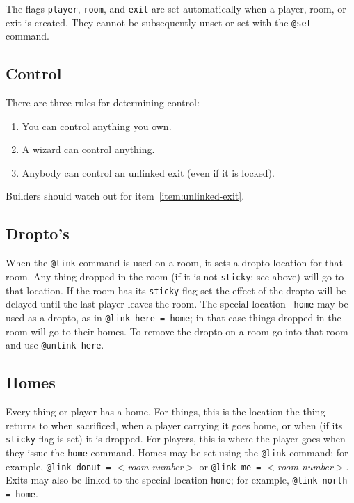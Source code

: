 The flags {\tt player\/}, {\tt room\/}, and {\tt exit} are set
automatically when a player, room, or exit is created.  They cannot be
subsequently unset or set with the \verb|@set| command.

\subsection{Control}
\label{sec:control}

There are three rules for determining control:
\begin{enumerate}
\item
You can control anything you own.
\item
A wizard can control anything.
\item\label{item:unlinked-exit}
Anybody can control an unlinked exit (even if it is locked).
\end{enumerate}
Builders should watch out for item~\ref{item:unlinked-exit}.

\subsection{Dropto's}
\label{sec:droptos}

When the {\tt @link} command is used on a room, it sets a dropto
location for that room.  Any thing dropped in the room (if it is not
{\tt sticky\/}; see above) will go to that location.  If the room has
its {\tt sticky\/} flag set the effect of the dropto will be delayed
until the last player leaves the room.  The special location {\tt
home} may be used as a dropto, as in {\tt @link here = home\/}; in
that case things dropped in the room will go to their
homes.  To remove the dropto on a room go into
that room and use {\tt @unlink here\/}.

\subsection{Homes}
\label{sec:homes}

Every thing or player has a home.  For things, this is the location
the thing returns to when sacrificed, when a player carrying it goes
home, or when (if its {\tt sticky\/} flag is set) it is dropped.  For
players, this is where the player goes when they issue the {\tt home}
command.  Homes may be set using the {\tt @link} command; for example,
{\tt @link donut =} $<${\em room-number\/}$>$ or {\tt @link me =}
$<${\em room-number\/}$>$.  Exits may also be
linked to the special location {\tt home\/}; for example, {\tt @link
north = home\/}.


